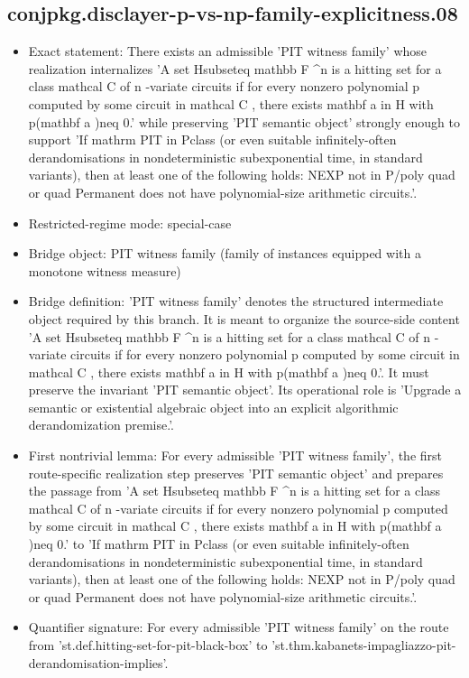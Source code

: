 \documentclass[11pt]{article}
\begin{document}
\subsection*{conjpkg.disclayer-p-vs-np-family-explicitness.08}
\begin{itemize}
\item Exact statement: There exists an admissible 'PIT witness family' whose realization internalizes 'A set Hsubseteq mathbb F \textasciicircum{}n is a hitting set for a class mathcal C of n -variate circuits if for every nonzero polynomial p computed by some circuit in mathcal C , there exists mathbf a in H with p(mathbf a )neq 0.' while preserving 'PIT semantic object' strongly enough to support 'If mathrm PIT in Pclass (or even suitable infinitely-often derandomisations in nondeterministic subexponential time, in standard variants), then at least one of the following holds: NEXP not in P/poly quad or quad Permanent does not have polynomial-size arithmetic circuits.'.
\item Restricted-regime mode: special-case
\item Bridge object: PIT witness family (family of instances equipped with a monotone witness measure)
\item Bridge definition: 'PIT witness family' denotes the structured intermediate object required by this branch. It is meant to organize the source-side content 'A set Hsubseteq mathbb F \textasciicircum{}n is a hitting set for a class mathcal C of n -variate circuits if for every nonzero polynomial p computed by some circuit in mathcal C , there exists mathbf a in H with p(mathbf a )neq 0.'. It must preserve the invariant 'PIT semantic object'. Its operational role is 'Upgrade a semantic or existential algebraic object into an explicit algorithmic derandomization premise.'.
\item First nontrivial lemma: For every admissible 'PIT witness family', the first route-specific realization step preserves 'PIT semantic object' and prepares the passage from 'A set Hsubseteq mathbb F \textasciicircum{}n is a hitting set for a class mathcal C of n -variate circuits if for every nonzero polynomial p computed by some circuit in mathcal C , there exists mathbf a in H with p(mathbf a )neq 0.' to 'If mathrm PIT in Pclass (or even suitable infinitely-often derandomisations in nondeterministic subexponential time, in standard variants), then at least one of the following holds: NEXP not in P/poly quad or quad Permanent does not have polynomial-size arithmetic circuits.'.
\item Quantifier signature: For every admissible 'PIT witness family' on the route from 'st.def.hitting-set-for-pit-black-box' to 'st.thm.kabanets-impagliazzo-pit-derandomisation-implies'.

\end{itemize}
\end{document}
